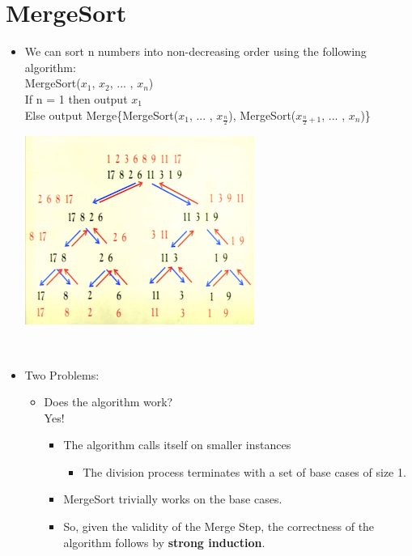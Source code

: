 \documentclass[12pt]{article}
\begin{document}
\section{MergeSort}
\renewcommand{\labelitemii}{$\circ$}
\renewcommand{\labelitemiii}{$\cdot$}
\renewcommand{\labelitemiii}{$\rightarrow$}
\begin{itemize}
\item We can sort n numbers into non-decreasing order using the following algorithm:\\
\large{
\noindent MergeSort($x_1$, $x_2$, ... , $x_n$)\\
\noindent If n = 1 then output $x_1$\\
\noindent Else output Merge\{MergeSort($x_1$, ... , $x_{\frac{n}{2}}$), MergeSort($x_{\frac{n}{2} + 			1}$, ... , $x_n$)\} }\\
	\begin{center}
	\includegraphics{lecture2a}
	\end{center} ~\newline
\item Two Problems:
	\begin{itemize}
	\item Does the algorithm work?\\
	\noindent Yes!
		\begin{itemize}
		\item The algorithm calls itself on smaller instances
			\begin{itemize}
			\item The division process terminates with a set of base cases of size 1.
			\end{itemize}
		\item MergeSort trivially works on the base cases. 
		\item So, given the validity of the Merge Step, the correctness of the algorithm follows by 				\textbf{strong induction}.
			\begin{itemize}

\end{itemize}
\end{itemize}
\end{itemize}
\end{itemize}
\end{document}
